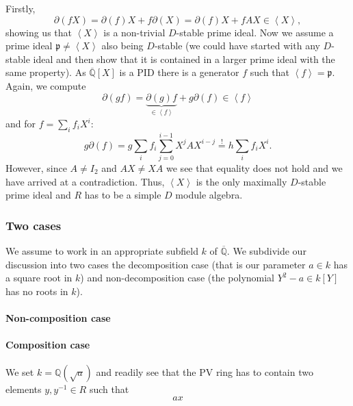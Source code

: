 \documentclass[10pt,a4paper]{article}
\newcommand{\qz}{{\mathbb{Q}}}
\newcommand{\qzcl}{\overline{\qz}}
\newcommand{\bao}[1]{\begin{array}{#1}}
\newcommand{\ea}{\end{array}}
\newcommand{\tens}[2]{\left(#1\right)^{\otimes #2}}
\newcommand{\tenso}[2]{#1^{\otimes #2}}
\newcommand{\twotens}[1]{\tens{#1}{2}}
\newcommand{\twotenso}[1]{\tenso{#1}{2}}
\begin{document}
Firstly,
$$\partial(f X) = \partial(f) X + f \partial(X) = \partial(f) X + f A X \in \left<X\right>,$$
showing us that $\left<X\right>$ is a non-trivial $D$-stable prime ideal. Now we assume a prime ideal $\mathfrak{p} \neq \left<X\right>$ also being $D$-stable (we could have started with any $D$-stable ideal and then show that it is contained in a larger prime ideal with the same property). As $\qzcl[X]$ is a PID there is a generator $f$ such that $\left<f\right> = \mathfrak{p}$. Again, we compute
$$\partial(g f) = \underbrace{\partial(g) f}_{\in \left<f\right>} + g \partial(f) \in \left<f\right>$$
and for $f = \sum_i f_i X^i$:
$$g \partial(f) = g \sum_i f_i \sum_{j=0}^{i-1} X^j A X^{i-j} \stackrel{!}{=} h \sum_i f_i X^i.$$
However, since $A \neq I_2$ and $A X \neq X A$ we see that equality does not hold and we have arrived at a contradiction. Thus, $\left<X\right>$ is the only maximally $D$-stable prime ideal and $R$ has to be a simple $D$ module algebra.
\subsubsection{Two cases}
We assume to work in an appropriate subfield $k$ of $\qzcl$. We subdivide our discussion into two cases the decomposition case (that is our parameter $a \in k$ has a square root in $k$) and non-decomposition case (the polynomial $Y^2 - a \in k[Y]$ has no roots in $k$).
\paragraph{Non-composition case}

\paragraph{Composition case}
We set $k = \qz(\sqrt{a})$ and readily see that the PV ring has to contain two elements $y, y^{-1} \in R$ such that
$$a x$$
\end{document}
